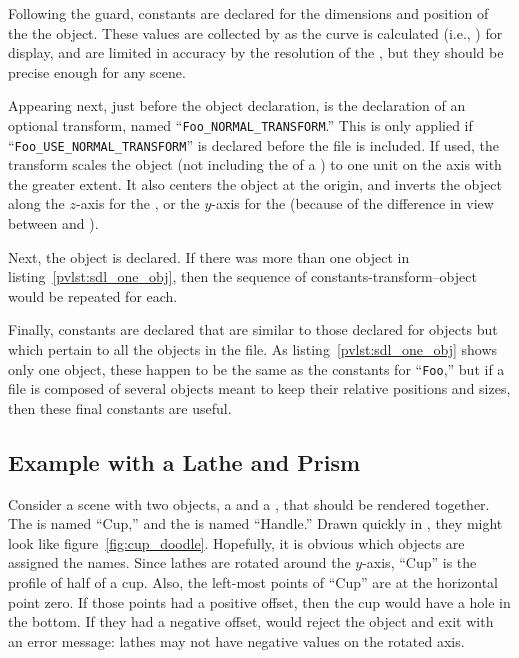 		Following the guard, constants are declared for the
		dimensions and position of the the object.
		These values are collected
		by \IXpkg{} as the curve is calculated
		(i.e., ) for display,
		and are limited in accuracy by the resolution of the
		, but they should be precise enough
		for any scene.
		
		Appearing next, just before the \IXspline{} object
		declaration, is the declaration of an optional transform,
		named ``\texttt{Foo\_NORMAL\_TRANSFORM}.''
		This is only applied if
		``\texttt{Foo\_USE\_NORMAL\_TRANSFORM}''
		is declared before the
		file is included. If used, the transform scales the object
		(not including the \emph{} of a \IXprism{})
		to one unit on the axis with the greater extent. It also
		centers the object at the origin, and inverts the object
		along the $z$-axis for the \IXprism{},
		or the $y$-axis for the \IXlathe{}
		(because of the difference in view
		between \IXpov{} and \IXpkg{}).
		
		Next, the object is declared. If there was more than
		one object in listing~\ref{pvlst:sdl_one_obj},
		then the sequence of constants-transform--object would
		be repeated for each.
		
		Finally, constants are declared that are similar to those
		declared for objects
		but which pertain to all the objects in the file.
		As listing~\ref{pvlst:sdl_one_obj} shows only one object,
		these happen to be the same as the constants for
		``\texttt{Foo},'' but if a file is composed of several
		objects meant to keep their relative positions and sizes,
		then these final constants are useful.


		\subsection{Example with a Lathe and Prism}%
		\label{ssec:ex_lath_and_prism}
		Consider a scene with two objects, a \IXlathe{} and a
		\IXprism{}, that should be rendered together. The \IXlathe{}
		is named ``Cup,'' and the \IXprism{} is named ``Handle.''
		Drawn quickly in \IXpkg{}, they might look like
		figure~\ref{fig:cup_doodle}.
		Hopefully, it is obvious which objects are assigned
		the names. Since lathes are rotated around
		the $y$-axis, ``Cup'' is the profile of half of a cup.
		Also, the left-most points of ``Cup'' are at the
		horizontal point zero. If those points had a positive
		offset, then the cup would have a hole in the bottom.
		If they had a negative offset, \IXpov{} would reject
		the object and exit with an error message: lathes may
		not have negative values on the rotated axis.

